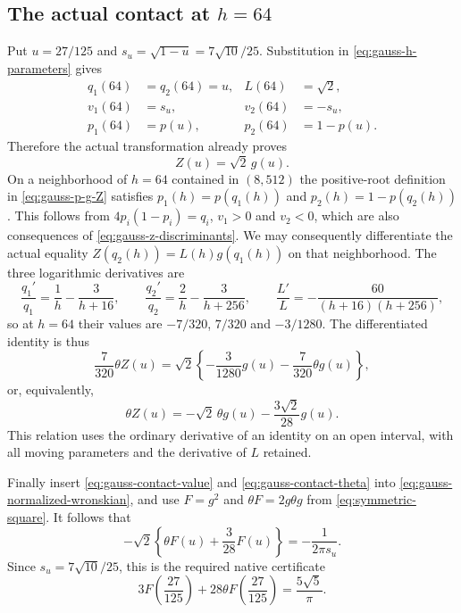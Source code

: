 \documentclass[11pt,a4paper]{article}
\begin{document}
\subsection{The actual contact at \texorpdfstring{$h=64$}{h=64}}

Put $u=27/125$ and $s_u=\sqrt{1-u}=7\sqrt{10}/25$.
Substitution in \eqref{eq:gauss-h-parameters} gives
\begin{equation}\label{eq:gauss-contact-parameters}
\begin{aligned}
 q_1(64)&=q_2(64)=u,&L(64)&=\sqrt2,\\
 v_1(64)&=s_u,&v_2(64)&=-s_u,\\
 p_1(64)&=p(u),&p_2(64)&=1-p(u).
\end{aligned}
\end{equation}
Therefore the actual transformation already proves
\begin{equation}\label{eq:gauss-contact-value}
                               Z(u)=\sqrt2\,g(u).
\end{equation}
On a neighborhood of $h=64$ contained in $(8,512)$ the positive-root
definition in \eqref{eq:gauss-p-g-Z} satisfies
$p_1(h)=p(q_1(h))$ and $p_2(h)=1-p(q_2(h))$.
This follows from $4p_i(1-p_i)=q_i$, $v_1>0$ and $v_2<0$,
which are also consequences of \eqref{eq:gauss-z-discriminants}.
We may consequently differentiate the actual equality
$Z(q_2(h))=L(h)g(q_1(h))$ on that neighborhood.
The three logarithmic derivatives are
\[
 \frac{q_1'}{q_1}=\frac1h-\frac3{h+16},\qquad
 \frac{q_2'}{q_2}=\frac2h-\frac3{h+256},\qquad
 \frac{L'}L=-\frac{60}{(h+16)(h+256)},
\]
so at $h=64$ their values are $-7/320$, $7/320$ and $-3/1280$.
The differentiated identity is thus
\[
 \frac7{320}\theta Z(u)
       =\sqrt2\left\{-\frac3{1280}g(u)
                                  -\frac7{320}\theta g(u)\right\},
\]
or, equivalently,
\begin{equation}\label{eq:gauss-contact-theta}
             \theta Z(u)=-\sqrt2\,\theta g(u)
                                      -\frac{3\sqrt2}{28}g(u).
\end{equation}
This relation uses the ordinary derivative of an identity on an open
interval, with all moving parameters and the derivative of $L$ retained.

Finally insert \eqref{eq:gauss-contact-value} and
\eqref{eq:gauss-contact-theta} into
\eqref{eq:gauss-normalized-wronskian}, and use
$F=g^2$ and $\theta F=2g\theta g$ from
\eqref{eq:symmetric-square}.  It follows that
\[
 -\sqrt2\left\{\theta F(u)+\frac3{28}F(u)\right\}
                         =-\frac1{2\pi s_u}.
\]
Since $s_u=7\sqrt{10}/25$, this is the required native certificate
\begin{equation}\label{eq:native-value}
 \boxed{\displaystyle
             3F\left(\frac{27}{125}\right)
                +28\theta F\left(\frac{27}{125}\right)
                           =\frac{5\sqrt5}{\pi}.}
\end{equation}
\end{document}

